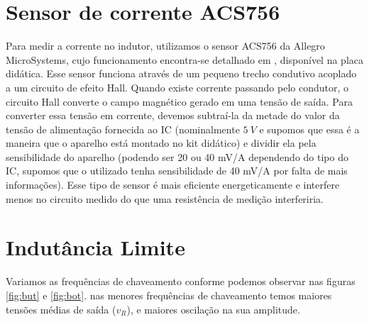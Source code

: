 \documentclass{article}
\begin{document}
\section{Sensor de corrente ACS756}
Para medir a corrente no indutor, utilizamos o sensor ACS756 da Allegro MicroSystems, cujo funcionamento encontra-se detalhado em \cite{bb:allegro}, disponível na placa didática. Esse sensor funciona através de um pequeno trecho condutivo acoplado a um circuito de efeito Hall. Quando existe corrente passando pelo condutor, o circuito Hall converte o campo magnético gerado em uma tensão de saída. Para converter essa tensão em corrente, devemos subtraí-la da metade do valor da tensão de alimentação fornecida ao IC (nominalmente $5\ V$ e supomos que essa é a maneira que o aparelho está montado no kit didático) e dividir ela pela sensibilidade do aparelho (podendo ser 20 ou 40 mV/A dependendo do tipo do IC, supomos que o utilizado tenha sensibilidade de 40 mV/A por falta de mais informações). Esse tipo de sensor é mais eficiente energeticamente e interfere menos no circuito medido do que uma resistência de medição interferiria.


\section{Indutância Limite}

Variamos as frequências de chaveamento conforme podemos observar nas figuras \ref{fig:but} e \ref{fig:bot}. nas menores frequências de chaveamento temos maiores tensões médias de saída ($v_R$), e maiores oscilação na sua amplitude.
\end{document}
